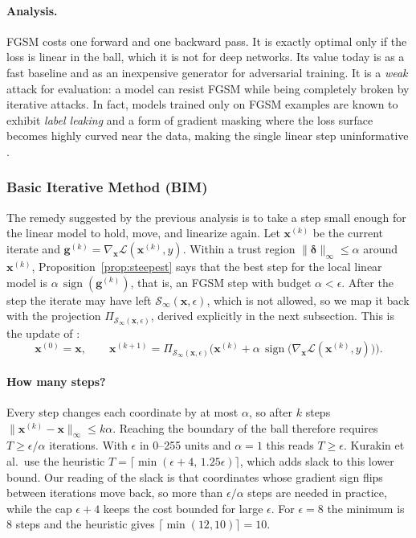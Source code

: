 \documentclass[10pt,a4paper]{extarticle}
\theoremstyle{definition}
\newcommand{\Loss}{\mathcal{L}}
\newcommand{\x}{\mathbf{x}}
\newcommand{\bdelta}{\boldsymbol{\delta}}
\newcommand{\Proj}{\Pi}
\DeclareMathOperator{\sign}{sign}
\begin{document}
\paragraph{Analysis.} FGSM costs one forward and one backward pass. It is exactly optimal only if the loss is linear in the ball, which it is not for deep networks. Its value today is as a fast baseline and as an inexpensive generator for adversarial training. It is a \emph{weak} attack for evaluation: a model can resist FGSM while being completely broken by iterative attacks. In fact, models trained only on FGSM examples are known to exhibit \emph{label leaking} and a form of gradient masking where the loss surface becomes highly curved near the data, making the single linear step uninformative \citep{tramer2018ensemble}.

\subsubsection{Basic Iterative Method (BIM)}

The remedy suggested by the previous analysis is to take a step small enough for the linear model to hold, move, and linearize again. Let \(\x^{(k)}\) be the current iterate and \(\mathbf{g}^{(k)}=\nabla_{\x}\Loss(\x^{(k)},y)\). Within a trust region \(\|\bdelta\|_\infty\le\alpha\) around \(\x^{(k)}\), Proposition~\ref{prop:steepest} says that the best step for the local linear model is \(\alpha\,\sign(\mathbf{g}^{(k)})\), that is, an FGSM step with budget \(\alpha<\epsilon\). After the step the iterate may have left \(\mathcal{S}_\infty(\x,\epsilon)\), which is not allowed, so we map it back with the projection \(\Proj_{\mathcal{S}_\infty(\x,\epsilon)}\), derived explicitly in the next subsection. This is the update of \citet{kurakin2017physical}:
\begin{equation}\label{eq:bim}
\x^{(0)} = \x,\qquad
\x^{(k+1)} = \Proj_{\mathcal{S}_\infty(\x,\epsilon)}\Big(\x^{(k)} + \alpha\,\sign\big(\nabla_{\x}\Loss(\x^{(k)},y)\big)\Big).
\end{equation}

\paragraph{How many steps?} Every step changes each coordinate by at most \(\alpha\), so after \(k\) steps \(\|\x^{(k)}-\x\|_\infty\le k\alpha\). Reaching the boundary of the ball therefore requires \(T\ge\epsilon/\alpha\) iterations. With \(\epsilon\) in 0--255 units and \(\alpha=1\) this reads \(T\ge\epsilon\). Kurakin et al.\ use the heuristic \(T=\lceil\min(\epsilon+4,\,1.25\epsilon)\rceil\), which adds slack to this lower bound. Our reading of the slack is that coordinates whose gradient sign flips between iterations move back, so more than \(\epsilon/\alpha\) steps are needed in practice, while the cap \(\epsilon+4\) keeps the cost bounded for large \(\epsilon\). For \(\epsilon=8\) the minimum is 8 steps and the heuristic gives \(\lceil\min(12,10)\rceil=10\).
\end{document}
